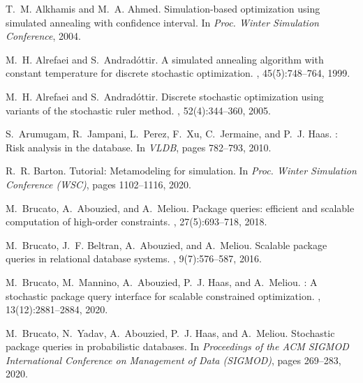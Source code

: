 \documentclass[11pt]{article}
\begin{document}
{\small   
\begin{thebibliography}{10}

T.~M. Alkhamis and M.~A. Ahmed.
\newblock Simulation-based optimization using simulated annealing with
  confidence interval.
\newblock In {\em Proc. Winter Simulation Conference}, 2004.

M.~H. Alrefaei and S.~Andrad{\'o}ttir.
\newblock A simulated annealing algorithm with constant temperature for
  discrete stochastic optimization.
, 45(5):748--764, 1999.

M.~H. Alrefaei and S.~Andrad{\'o}ttir.
\newblock Discrete stochastic optimization using variants of the stochastic
  ruler method.
, 52(4):344--360, 2005.

S.~Arumugam, R.~Jampani, L.~Perez, F.~Xu, C.~Jermaine, and P.~J. Haas.
: Risk analysis in the database.
\newblock In {\em VLDB}, pages 782--793, 2010.

R.~R. Barton.
\newblock Tutorial: {M}etamodeling for simulation.
\newblock In {\em Proc. Winter Simulation Conference (WSC)}, pages 1102--1116,
  2020.

M.~Brucato, A.~Abouzied, and A.~Meliou.
\newblock Package queries: efficient and scalable computation of high-order
  constraints.
, 27(5):693--718, 2018.

M.~Brucato, J.~F. Beltran, A.~Abouzied, and A.~Meliou.
\newblock Scalable package queries in relational database systems.
, 9(7):576--587, 2016.

M.~Brucato, M.~Mannino, A.~Abouzied, P.~J. Haas, and A.~Meliou.
: {A} stochastic package query interface for scalable
  constrained optimization.
, 13(12):2881--2884, 2020.

M.~Brucato, N.~Yadav, A.~Abouzied, P.~J. Haas, and A.~Meliou.
\newblock Stochastic package queries in probabilistic databases.
\newblock In {\em Proceedings of the ACM SIGMOD International Conference on
  Management of Data (SIGMOD)}, pages 269--283, 2020.


\end{thebibliography}}
\end{document}
